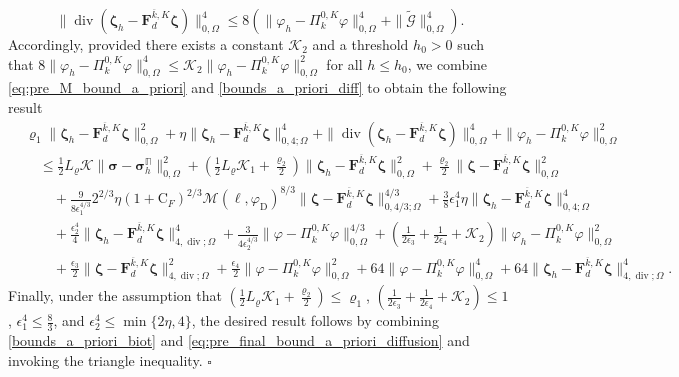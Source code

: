 \documentclass[fleqn,a4paper]{cas-sc}
\newcommand\vdiv{\mathop{\mathrm{div}}\nolimits}
\newcommand{\bF}{\mathbf{F}}
\newcommand{\bzeta}{\boldsymbol{\zeta}}
\newcommand{\0}{\boldsymbol{0}}
\newcommand\bbPi{\mathbb{\Pi}}
\newcommand\bsigma{\boldsymbol{\sigma}}
\numberwithin{equation}{section}
\numberwithin{figure}{section}
\newenvironment{proof}{\noindent{\it Proof.}}{\hfill$\square$}
\begin{document}
\begin{proof}
\begin{equation*}
    \|\vdiv(\bzeta_h - \bF_d^{\overline{k},K}\bzeta) \|^4_{0,\Omega}\leq 8(\|\varphi_h-\Pi_k^{0,K}\varphi\|^4_{0,\Omega}+\|\widetilde{\mathcal{G}}\|^4_{0,\Omega}).
\end{equation*}
Accordingly, provided there exists a constant $\mathcal{K}_2$ and a threshold $h_0 > 0$ such that $8\|\varphi_h-\Pi_k^{0,K}\varphi\|^4_{0,\Omega} \leq \mathcal{K}_2\|\varphi_h-\Pi_k^{0,K}\varphi\|^2_{0,\Omega}$ for all $h \leq h_0$, we combine \eqref{eq:pre_M_bound_a_priori} and \eqref{bounds_a_priori_diff} to obtain the following result
\begin{align}\label{eq:pre_final_bound_a_priori_diffusion}
        &\varrho_1\|\bzeta_h - \bF_d^{\overline{k},K}\bzeta\|_{0,\Omega}^2+{\eta} \|\bzeta_h - \bF_d^{\overline{k},K}\bzeta\|_{0,4;\Omega}^4+\|\vdiv(\bzeta_h - \bF_d^{\overline{k},K}\bzeta)\|_{0,\Omega}^4 + \|\varphi_h-\Pi_k^{0,K}\varphi\|_{0, \Omega}^2 \nonumber \\
        & \quad \leq   \frac{1}{2}L_\varrho\mathcal{K}\|\bsigma-{\bsigma}_h^\bbPi\|^2_{0,\Omega}+\left(\frac{1}{2}L_\varrho\mathcal{K}_1+\frac{\varrho_2}{2}\right)\|\bzeta_h-\bF_d^{\overline{k},K}\bzeta\|^2_{{0,\Omega}}+\frac{\varrho_2}{2}\|\bzeta-\bF_d^{\overline{k},K}\bzeta\|^2_{{0,\Omega}} \nonumber\\
        &\qquad +\frac{9}{8\epsilon_1^{4/3}} 2^{2/3}\eta(1+\mathrm{C}_F)^{2/3}\mathcal{M}(\ell, \varphi_{\mathrm{D}})^{8/3}\|\bzeta-\bF_d^{\overline{k},K}\bzeta\|^{4/3}_{{0,4/3;\Omega}}+\frac{3}{8}\epsilon_1^4\eta\|\bzeta_h-\bF_d^{\overline{k},K}\bzeta\|^{4}_{{0,4;\Omega}}\nonumber\\
        &\qquad +\frac{\epsilon_2^4}{4}\|\bzeta_h - \bF_d^{\overline{k},K}\bzeta\|_{4,\vdiv;\Omega}^4+\frac{3}{4\epsilon_2^{4/3}}\|\varphi-\Pi_k^{0,K}\varphi\|_{0,\Omega}^{4/3}+\left(\frac{1}{2\epsilon_3}+\frac{1}{2\epsilon_4}+\mathcal{K}_2\right)\|\varphi_h-\Pi_k^{0,K}\varphi\|_{0,\Omega}^2\nonumber\\
        &\qquad + \frac{\epsilon_3}{2}\|\bzeta-\bF_d^{\overline{k},K}\bzeta\|^2_{4,\vdiv;\Omega}+\frac{\epsilon_4}{2}\|\varphi-\Pi_k^{0,K}\varphi\|_{0, \Omega}^2+64\|\varphi-\Pi_k^{0,K}\varphi\|_{0, \Omega}^4+64\|\bzeta_h-\bF_d^{\overline{k},K}\bzeta\|^4_{{4,\vdiv;\Omega}}.
    \end{align}
    Finally, under the assumption that $\left(\frac{1}{2}{L}_\varrho\mathcal{K}_1+\frac{\varrho_2}{2}\right)\leq \varrho_1$, $\left(\frac{1}{2\epsilon_3}+\frac{1}{2\epsilon_4}+\mathcal{K}_2\right)\leq 1$, $\epsilon_1^4\leq\frac{8}{3}$, and ${\epsilon_2^4}\leq \min\{2\eta,4\}$, the desired result follows by combining \eqref{bounds_a_priori_biot} and \eqref{eq:pre_final_bound_a_priori_diffusion} and invoking the triangle inequality.
\end{proof}
\end{document}
